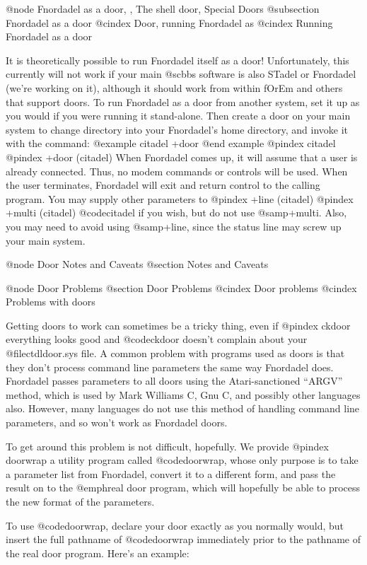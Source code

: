 {@node Fnordadel as a door,  , The shell door, Special Doors
@subsection Fnordadel as a door
@cindex Door, running Fnordadel as
@cindex Running Fnordadel as a door

It is theoretically possible to run Fnordadel itself as a door!
Unfortunately, this currently will not work if your main @sc{bbs}
software is also STadel or Fnordadel (we're working on it), although it
should work from within fOrEm and others that support doors.  To
run Fnordadel as a door from another system, set it up as you
would if you were running it stand-alone.  Then create a door on
your main system to change directory into your Fnordadel's home
directory, and invoke it with the command:
@example
citadel +door
@end example
@pindex citadel
@pindex +door (citadel)
When Fnordadel comes up, it will assume that a user is already
connected.  Thus, no modem commands or controls will be used.
When the user terminates, Fnordadel will exit and return control
to the calling program.  You may supply other parameters to
@pindex +line (citadel)
@pindex +multi (citadel)
@code{citadel} if you wish, but do not use @samp{+multi}.  Also, you may
need to avoid using @samp{+line}, since the status line may screw up
your main system.

@node Door Notes and Caveats
@section Notes and Caveats

@node Door Problems
@section Door Problems
@cindex Door problems
@cindex Problems with doors

Getting doors to work can sometimes be a tricky thing, even if
@pindex ckdoor
everything looks good and @code{ckdoor} doesn't complain about your
@file{ctdldoor.sys} file.  A common problem with programs used as
doors is that they don't process command line parameters the same
way Fnordadel does.  Fnordadel passes parameters to all doors using
the Atari-sanctioned ``ARGV'' method, which is used by Mark Williams C,
Gnu C, and possibly other languages also.  However, many languages do
not use this method of handling command line parameters, and so won't
work as Fnordadel doors.

To get around this problem is not difficult, hopefully.  We provide
@pindex doorwrap
a utility program called @code{doorwrap}, whose only purpose is to
take a parameter list from Fnordadel, convert it to a different form,
and pass the result on to the @emph{real} door program, which will
hopefully be able to process the new format of the parameters.

To use @code{doorwrap}, declare your door exactly as you normally would,
but insert the full pathname of @code{doorwrap} immediately prior to
the pathname of the real door program.  Here's an example:

}
